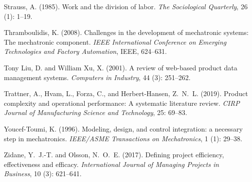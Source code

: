 \documentclass{PDS}
\begin{document}
\begin{Backmatter}
\begin{thebibliography}{21}
     Strauss, A. (1985). \newblock Work and the division of labor. \newblock \emph{The Sociological Quarterly}, 26 (1): 1--19.
    
     Thramboulidis, K. (2008). \newblock Challenges in the development of mechatronic systems: The mechatronic component. \newblock \emph{IEEE International Conference on Emerging Technologies and Factory Automation}, IEEE, 624--631.
    
     {Tony Liu}, D. and {William Xu}, X. (2001). \newblock A review of web-based product data management systems. \newblock \emph{Computers in Industry}, 44 (3): 251--262.
    
     Trattner, A., Hvam, L., Forza, C., and Herbert-Hansen, Z.~N.~L. (2019). \newblock Product complexity and operational performance: A systematic literature review. \newblock \emph{CIRP Journal of Manufacturing Science and Technology}, 25: 69--83.
    
     Youcef-Toumi, K. (1996). \newblock Modeling, design, and control integration: a necessary step in mechatronics. \newblock \emph{IEEE/ASME Transactions on Mechatronics}, 1 (1): 29--38.
    
     Zidane, Y.~J.-T. and Olsson, N.~O.~E. (2017). \newblock Defining project efficiency, effectiveness and efficacy. \newblock \emph{International Journal of Managing Projects in Business}, 10 (3): 621--641.
        
\end{thebibliography}

\end{Backmatter}
\end{document}
